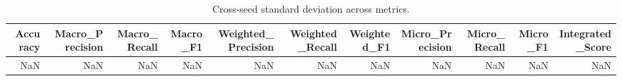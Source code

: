 \begin{table}[t]
\centering
\begin{tabular}{rrrrrrrrrrr}
\toprule
Accuracy & Macro_Precision & Macro_Recall & Macro_F1 & Weighted_Precision & Weighted_Recall & Weighted_F1 & Micro_Precision & Micro_Recall & Micro_F1 & Integrated_Score \\
\midrule
NaN & NaN & NaN & NaN & NaN & NaN & NaN & NaN & NaN & NaN & NaN \\
\bottomrule
\end{tabular}
\caption{Cross-seed standard deviation across metrics.}
\label{tab:cross_seed_std}
\end{table}